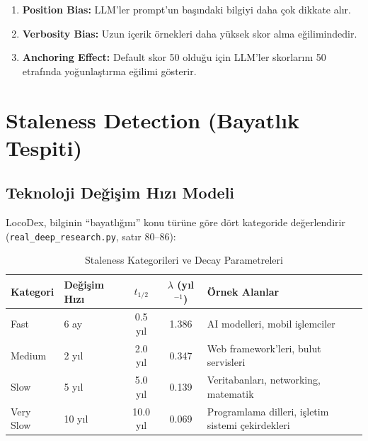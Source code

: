 \begin{enumerate}
  \item \textbf{Position Bias:} LLM'ler prompt'un ba\c{s}{\i}ndaki bilgiyi daha \c{c}ok dikkate al{\i}r.
  \item \textbf{Verbosity Bias:} Uzun i\c{c}erik \"{o}rnekleri daha y\"{u}ksek skor alma e\u{g}ilimindedir.
  \item \textbf{Anchoring Effect:} Default skor 50 oldu\u{g}u i\c{c}in LLM'ler skorlar{\i}n{\i} 50 etraf{\i}nda yo\u{g}unla\c{s}t{\i}rma e\u{g}ilimi g\"{o}sterir.
\end{enumerate}


\section{Staleness Detection (Bayatl{\i}k Tespiti)}
\label{sec:staleness}

\subsection{Teknoloji De\u{g}i\c{s}im H{\i}z{\i} Modeli}

LocoDex, bilginin ``bayatl{\i}\u{g}{\i}n{\i}'' konu t\"{u}r\"{u}ne g\"{o}re d\"{o}rt kategoride de\u{g}erlendirir (\texttt{real\_deep\_research.py}, sat{\i}r 80--86):

\begin{table}[H]
\centering
\caption{Staleness Kategorileri ve Decay Parametreleri}
\label{tab:staleness-params}
\begin{tabularx}{\textwidth}{llccX}
\toprule
\color{chapterBlue}\textbf{Kategori} & \color{chapterBlue}\textbf{De\u{g}i\c{s}im H{\i}z{\i}} & \color{chapterBlue}\textbf{$t_{1/2}$} & \color{chapterBlue}\textbf{$\lambda$ (y{\i}l$^{-1}$)} & \color{chapterBlue}\textbf{\"{O}rnek Alanlar} \\
\midrule
Fast      & 6 ay  & 0.5 y{\i}l  & 1.386 & AI modelleri, mobil i\c{s}lemciler \\
Medium    & 2 y{\i}l & 2.0 y{\i}l  & 0.347 & Web framework'leri, bulut servisleri \\
Slow      & 5 y{\i}l & 5.0 y{\i}l  & 0.139 & Veritabanlar{\i}, networking, matematik \\
Very Slow & 10 y{\i}l & 10.0 y{\i}l & 0.069 & Programlama dilleri, i\c{s}letim sistemi \c{c}ekirdekleri \\
\bottomrule
\end{tabularx}
\end{table}

